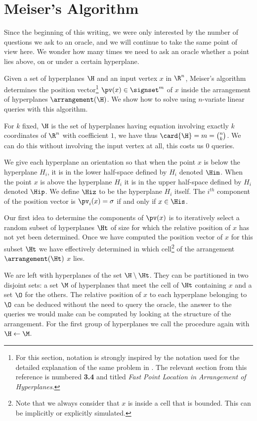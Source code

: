 \section{Meiser's Algorithm}

Since the beginning of this writing, we were only interested by the number of
questions we ask to an oracle, and we will continue to take the same point of
view here. We wonder how many times we need to ask an oracle whether a point
lies above, on or under a certain hyperplane.

Given a set of hyperplanes \(\H\) and an input vertex \(x\) in \(\R^n\),
Meiser's algorithm \cite{meiser:1993} determines the position vector\footnote{
For this section, notation is strongly inspired by the notation
used for the detailed explanation of the same problem in \citet*{burgisser:1997}.
The relevant section from this reference is numbered \textbf{3.4} and titled
\emph{Fast Point Location in Arrangement of Hyperplanes}.
}
$\pv(x) \in
\signset^{m}$ of $x$ inside the
arrangement of hyperplanes $\arrangement(\H)$.
We show how to solve \kSUM using  $n$-variate
linear queries with this algorithm.

For \(k\) fixed,
\(\H\) is the set of hyperplanes having equation involving exactly $k$
coordinates of $\R^n$ with coefficient $1$, we have thus $\card{\H} = m =
\binom{n}{k}$. We can do this without involving the input vertex at all, this
costs us $0$ queries.

We give each hyperplane an orientation so that when the point $x$ is below
the
hyperplane $H_i$, it is in the lower half-space defined by $H_i$ denoted
$\Him$. When the point $x$ is above the hyperplane $H_i$ it is in the upper
half-space defined by $H_i$ denoted $\Hip$. We define $\Hiz$ to be the
hyperplane $H_i$ itself. The $i^{th}$ component of the position vector is
$\pv_i(x) = \sigma$ if and only if $x \in \His$.

Our first idea to determine the components of $\pv(x)$ is to iteratively
select a random subset of hyperplanes \(\Ht\) of size 
for which the relative position of $x$ has not yet been
determined. Once we have
computed the position vector of \(x\) for this subset \(\Ht\)
we have effectively determined in
which cell\footnote{Note that we always consider that \(x\) is inside a cell that is bounded.
This can be implicitly or explicitly simulated.}
of the arrangement $\arrangement(\Ht)$ $x$ lies.

We are left with hyperplanes of the set $\H \setminus \Ht$. They can be
partitioned in two disjoint sets: a set $\M$ of hyperplanes that meet the cell of
$\Ht$ containing $x$ and a set $\O$ for the others. The relative position of $x$
to each hyperplane belonging to $\O$ can be deduced without the need to query
the oracle, the answer to the queries we would make can be computed by looking
at the structure of the arrangement. For the first group of hyperplanes
we call the procedure again with $\H \gets \M$.

